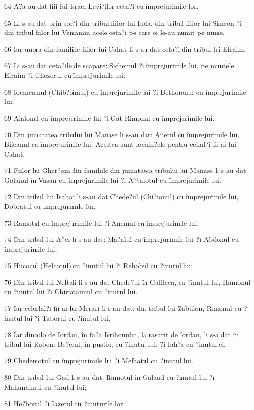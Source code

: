 \par 64 A?a au dat fiii lui Israel Levi?ilor ceta?i cu împrejurimile lor.
\par 65 Li s-au dat prin sor?i din tribul fiilor lui Iuda, din tribul fiilor lui Simeon ?i din tribul fiilor lui Veniamin acele ceta?i pe care ei le-au numit pe nume.
\par 66 Iar unora din familiile fiilor lui Cahat li s-au dat ceta?i din tribul lui Efraim.
\par 67 Li s-au dat ceta?ile de scapare: Sichemul ?i împrejurimile lui, pe muntele Efraim ?i Ghezerul cu împrejurimile lui;
\par 68 Iocmeamul (Chib?oimul) cu împrejurimile lui ?i Bethoronul cu împrejurimile lui;
\par 69 Aialonul cu împrejurimile lui ?i Gat-Rimonul cu împrejurimile lui.
\par 70 Din jumatatea tribului lui Manase li s-au dat: Anerul cu împrejurimile lui, Bileanul cu împrejurimile lui. Acestea sunt locuin?ele pentru ceilal?i fii ai lui Cahat.
\par 71 Fiilor lui Gher?om din familiile din jumatatea tribului lui Manase li s-au dat Golanul în Vasan cu împrejurimile lui ?i A?tarotul cu împrejurimile lui.
\par 72 Din tribul lui Isahar li s-au dat Chede?ul (Chi?ionul) cu împrejurimile lui, Dobratul cu împrejurimile lui,
\par 73 Ramotul cu împrejurimile lui ?i Anemul cu împrejurimile lui.
\par 74 Din tribul lui A?er li s-au dat: Ma?alul cu împrejurimile lui ?i Abdonul cu împrejurimile lui;
\par 75 Hucocul (Helcotul) cu ?inutul lui ?i Rehobul cu ?inutul lui;
\par 76 Din tribul lui Neftali li s-au dat Chede?ul în Galileea, cu ?inutul lui, Hamonul cu ?inutul lui ?i Chiriataimul cu ?inutul lui.
\par 77 Iar celorlal?i fii ai lui Merari li s-au dat: din tribul lui Zabulon, Rimonul cu ?inutul lui ?i Taborul cu ?inutul lui,
\par 78 Iar dincolo de Iordan, în fa?a Ierihonului, la rasarit de Iordan, li s-a dat în tribul lui Ruben: Be?erul, în pustiu, cu ?inutul lui, ?i Iah?a cu ?inutul ei,
\par 79 Chedemotul cu împrejurimile lui ?i Mefaatul cu ?inutul lui.
\par 80 Din tribul lui Gad li s-au dat: Ramotul în Galaad cu ?inutul lui ?i Mahanaimul cu ?inutul lui;
\par 81 He?bonul ?i Iazerul cu ?inuturile lor.

